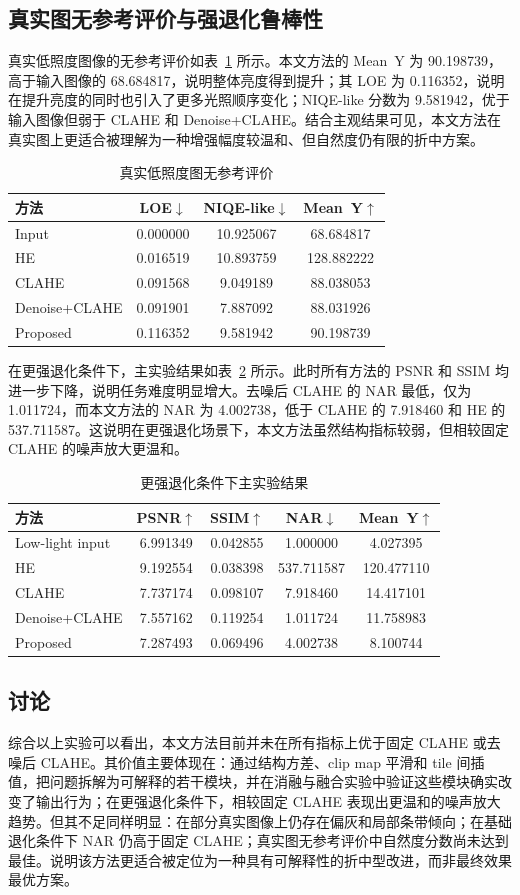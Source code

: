 \subsection{真实图无参考评价与强退化鲁棒性}
真实低照度图像的无参考评价如表~\ref{tab:real-nr} 所示。本文方法的 Mean~Y 为 90.198739，高于输入图像的 68.684817，说明整体亮度得到提升；其 LOE 为 0.116352，说明在提升亮度的同时也引入了更多光照顺序变化；NIQE-like 分数为 9.581942，优于输入图像但弱于 CLAHE 和 Denoise+CLAHE。结合主观结果可见，本文方法在真实图上更适合被理解为一种增强幅度较温和、但自然度仍有限的折中方案。

\begin{table}[H]
\centering
\caption{真实低照度图无参考评价}
\label{tab:real-nr}
\begin{tabular}{lccc}
\toprule
方法 & LOE$\downarrow$ & NIQE-like$\downarrow$ & Mean~Y$\uparrow$ \\
\midrule
Input & 0.000000 & 10.925067 & 68.684817 \\
HE & 0.016519 & 10.893759 & 128.882222 \\
CLAHE & 0.091568 & 9.049189 & 88.038053 \\
Denoise+CLAHE & 0.091901 & 7.887092 & 88.031926 \\
Proposed & 0.116352 & 9.581942 & 90.198739 \\
\bottomrule
\end{tabular}
\end{table}

在更强退化条件下，主实验结果如表~\ref{tab:hard} 所示。此时所有方法的 PSNR 和 SSIM 均进一步下降，说明任务难度明显增大。去噪后 CLAHE 的 NAR 最低，仅为 1.011724，而本文方法的 NAR 为 4.002738，低于 CLAHE 的 7.918460 和 HE 的 537.711587。这说明在更强退化场景下，本文方法虽然结构指标较弱，但相较固定 CLAHE 的噪声放大更温和。

\begin{table}[H]
\centering
\caption{更强退化条件下主实验结果}
\label{tab:hard}
\begin{tabular}{lcccc}
\toprule
方法 & PSNR$\uparrow$ & SSIM$\uparrow$ & NAR$\downarrow$ & Mean~Y$\uparrow$ \\
\midrule
Low-light input & 6.991349 & 0.042855 & 1.000000 & 4.027395 \\
HE & 9.192554 & 0.038398 & 537.711587 & 120.477110 \\
CLAHE & 7.737174 & 0.098107 & 7.918460 & 14.417101 \\
Denoise+CLAHE & 7.557162 & 0.119254 & 1.011724 & 11.758983 \\
Proposed & 7.287493 & 0.069496 & 4.002738 & 8.100744 \\
\bottomrule
\end{tabular}
\end{table}

\subsection{讨论}
综合以上实验可以看出，本文方法目前并未在所有指标上优于固定 CLAHE 或去噪后 CLAHE。其价值主要体现在：通过结构方差、clip map 平滑和 tile 间插值，把问题拆解为可解释的若干模块，并在消融与融合实验中验证这些模块确实改变了输出行为；在更强退化条件下，相较固定 CLAHE 表现出更温和的噪声放大趋势。但其不足同样明显：在部分真实图像上仍存在偏灰和局部条带倾向；在基础退化条件下 NAR 仍高于固定 CLAHE；真实图无参考评价中自然度分数尚未达到最佳。说明该方法更适合被定位为一种具有可解释性的折中型改进，而非最终效果最优方案。
